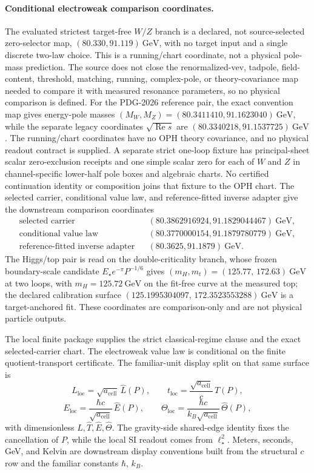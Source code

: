 \paragraph{Conditional electroweak comparison coordinates.}
The evaluated strictest target-free \(W/Z\) branch is a declared,
not source-selected zero-selector map,
\((80.330,91.119)~\mathrm{GeV}\), with no target input and a single discrete
two-law choice. This is a running/chart coordinate, not a physical pole-mass
prediction. The source does not close the renormalized-vev, tadpole,
field-content, threshold, matching, running, complex-pole, or theory-covariance
map needed to compare it with measured resonance parameters, so no physical
comparison is defined. For the PDG-2026 reference pair, the exact
convention map gives energy-pole masses
\((M_W,M_Z)=(80.3411410,91.1623040)~\mathrm{GeV}\), while the separate legacy
coordinates \(\sqrt{\operatorname{Re}s}\) are
\((80.3340218,91.1537725)~\mathrm{GeV}\). The running/chart coordinates have
no OPH theory covariance, and no physical readout contract is supplied. A
separate strict one-loop fixture has principal-sheet scalar zero-exclusion
receipts and one simple scalar zero for each of \(W\) and \(Z\) in
channel-specific lower-half pole boxes and algebraic charts.
No certified continuation identity or composition joins that fixture to the
OPH chart. The
selected carrier, conditional value law, and reference-fitted inverse adapter give
the downstream comparison coordinates
\[
\begin{array}{rcl}
\text{selected carrier} && (80.3862916924,91.1829044467)~\mathrm{GeV},\\
\text{conditional value law} && (80.3770000154,91.1879780779)~\mathrm{GeV},\\
\text{reference-fitted inverse adapter} && (80.3625,91.1879)~\mathrm{GeV}.
\end{array}
\]
The Higgs/top pair is read on the double-criticality branch, whose frozen
boundary-scale candidate \(E_\star e^{-\pi}P^{-1/6}\) gives
\((m_H,m_t)=(125.77,\allowbreak\,172.63)~\mathrm{GeV}\) at two loops, with
\(m_H=125.72~\mathrm{GeV}\) on the fit-free curve at the measured top; the
declared calibration surface
\((125.1995304097,\allowbreak\,172.3523553288)~\mathrm{GeV}\) is a target-anchored fit.
These coordinates are comparison-only and are not physical particle outputs.

The local finite package supplies the strict classical-regime clause and the exact selected-carrier
chart. The electroweak value law is conditional on the finite quotient-transport certificate.
The familiar-unit display split on that same surface is
\[
L_{\mathrm{loc}}=\sqrt{a_{\mathrm{cell}}}\,\widehat L(P),\qquad
t_{\mathrm{loc}}=\frac{\sqrt{a_{\mathrm{cell}}}}{c}\,\widehat T(P),
\]
\[
E_{\mathrm{loc}}=\frac{\hbar c}{\sqrt{a_{\mathrm{cell}}}}\,\widehat E(P),\qquad
\Theta_{\mathrm{loc}}=\frac{\hbar c}{k_B\sqrt{a_{\mathrm{cell}}}}\,\widehat\Theta(P),
\]
with dimensionless \(\widehat L,\widehat T,\widehat E,\widehat\Theta\). The gravity-side
shared-edge identity fixes the cancellation of \(P\), while the local SI readout comes from
\(\ell_\star^2\). Meters, seconds, GeV, and Kelvin are downstream display conventions built from
the structural \(c\) row and the familiar constants \(\hbar\), \(k_B\).

